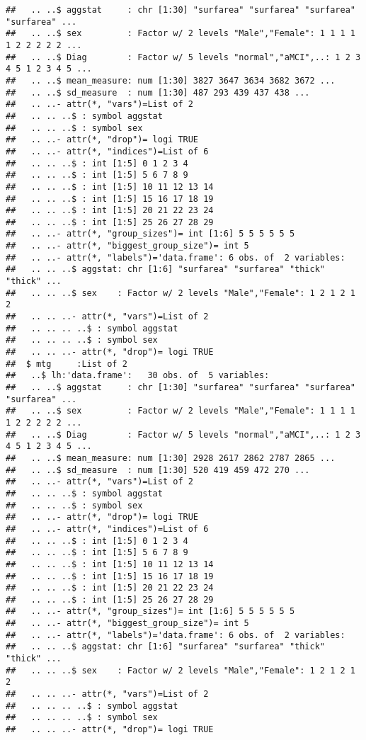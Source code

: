 \documentclass[12pt]{article}\usepackage[]{graphicx}\usepackage[]{color}
\makeatletter
\newenvironment{kframe}{%
 \def\at@end@of@kframe{}%
 \ifinner\ifhmode%
  \def\at@end@of@kframe{\end{minipage}}%
  \begin{minipage}{\columnwidth}%
 \fi\fi%
 \def\FrameCommand##1{\hskip\@totalleftmargin \hskip-\fboxsep
 \colorbox{shadecolor}{##1}\hskip-\fboxsep
     \hskip-\linewidth \hskip-\@totalleftmargin \hskip\columnwidth}%
 \MakeFramed {\advance\hsize-\width
   \@totalleftmargin\z@ \linewidth\hsize
   \@setminipage}}%
 {\par\unskip\endMakeFramed%
 \at@end@of@kframe}
\newenvironment{knitrout}{}{} %
\makeatother
\begin{document}
\begin{knitrout}
\begin{kframe}
\begin{verbatim}
##   .. ..$ aggstat     : chr [1:30] "surfarea" "surfarea" "surfarea" "surfarea" ...
##   .. ..$ sex         : Factor w/ 2 levels "Male","Female": 1 1 1 1 1 2 2 2 2 2 ...
##   .. ..$ Diag        : Factor w/ 5 levels "normal","aMCI",..: 1 2 3 4 5 1 2 3 4 5 ...
##   .. ..$ mean_measure: num [1:30] 3827 3647 3634 3682 3672 ...
##   .. ..$ sd_measure  : num [1:30] 487 293 439 437 438 ...
##   .. ..- attr(*, "vars")=List of 2
##   .. .. ..$ : symbol aggstat
##   .. .. ..$ : symbol sex
##   .. ..- attr(*, "drop")= logi TRUE
##   .. ..- attr(*, "indices")=List of 6
##   .. .. ..$ : int [1:5] 0 1 2 3 4
##   .. .. ..$ : int [1:5] 5 6 7 8 9
##   .. .. ..$ : int [1:5] 10 11 12 13 14
##   .. .. ..$ : int [1:5] 15 16 17 18 19
##   .. .. ..$ : int [1:5] 20 21 22 23 24
##   .. .. ..$ : int [1:5] 25 26 27 28 29
##   .. ..- attr(*, "group_sizes")= int [1:6] 5 5 5 5 5 5
##   .. ..- attr(*, "biggest_group_size")= int 5
##   .. ..- attr(*, "labels")='data.frame':	6 obs. of  2 variables:
##   .. .. ..$ aggstat: chr [1:6] "surfarea" "surfarea" "thick" "thick" ...
##   .. .. ..$ sex    : Factor w/ 2 levels "Male","Female": 1 2 1 2 1 2
##   .. .. ..- attr(*, "vars")=List of 2
##   .. .. .. ..$ : symbol aggstat
##   .. .. .. ..$ : symbol sex
##   .. .. ..- attr(*, "drop")= logi TRUE
##  $ mtg     :List of 2
##   ..$ lh:'data.frame':	30 obs. of  5 variables:
##   .. ..$ aggstat     : chr [1:30] "surfarea" "surfarea" "surfarea" "surfarea" ...
##   .. ..$ sex         : Factor w/ 2 levels "Male","Female": 1 1 1 1 1 2 2 2 2 2 ...
##   .. ..$ Diag        : Factor w/ 5 levels "normal","aMCI",..: 1 2 3 4 5 1 2 3 4 5 ...
##   .. ..$ mean_measure: num [1:30] 2928 2617 2862 2787 2865 ...
##   .. ..$ sd_measure  : num [1:30] 520 419 459 472 270 ...
##   .. ..- attr(*, "vars")=List of 2
##   .. .. ..$ : symbol aggstat
##   .. .. ..$ : symbol sex
##   .. ..- attr(*, "drop")= logi TRUE
##   .. ..- attr(*, "indices")=List of 6
##   .. .. ..$ : int [1:5] 0 1 2 3 4
##   .. .. ..$ : int [1:5] 5 6 7 8 9
##   .. .. ..$ : int [1:5] 10 11 12 13 14
##   .. .. ..$ : int [1:5] 15 16 17 18 19
##   .. .. ..$ : int [1:5] 20 21 22 23 24
##   .. .. ..$ : int [1:5] 25 26 27 28 29
##   .. ..- attr(*, "group_sizes")= int [1:6] 5 5 5 5 5 5
##   .. ..- attr(*, "biggest_group_size")= int 5
##   .. ..- attr(*, "labels")='data.frame':	6 obs. of  2 variables:
##   .. .. ..$ aggstat: chr [1:6] "surfarea" "surfarea" "thick" "thick" ...
##   .. .. ..$ sex    : Factor w/ 2 levels "Male","Female": 1 2 1 2 1 2
##   .. .. ..- attr(*, "vars")=List of 2
##   .. .. .. ..$ : symbol aggstat
##   .. .. .. ..$ : symbol sex
##   .. .. ..- attr(*, "drop")= logi TRUE

\end{verbatim}
\end{kframe}
\end{knitrout}
\end{document}
